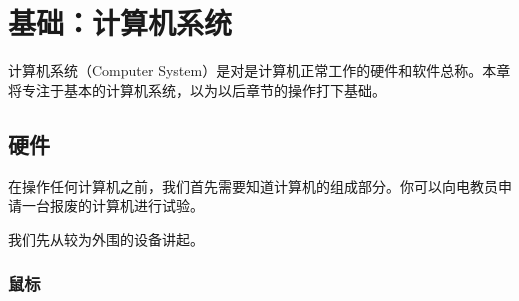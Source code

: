 \part{基础：计算机系统}
计算机系统（Computer System）是对是计算机正常工作的硬件和软件总称。本章将专注于基本的计算机系统，以为以后章节的操作打下基础。
\chapter{硬件}
在操作任何计算机之前，我们首先需要知道计算机的组成部分。你可以向电教员申请一台报废的计算机进行试验。\par
我们先从较为外围的设备讲起。
\section{鼠标}
